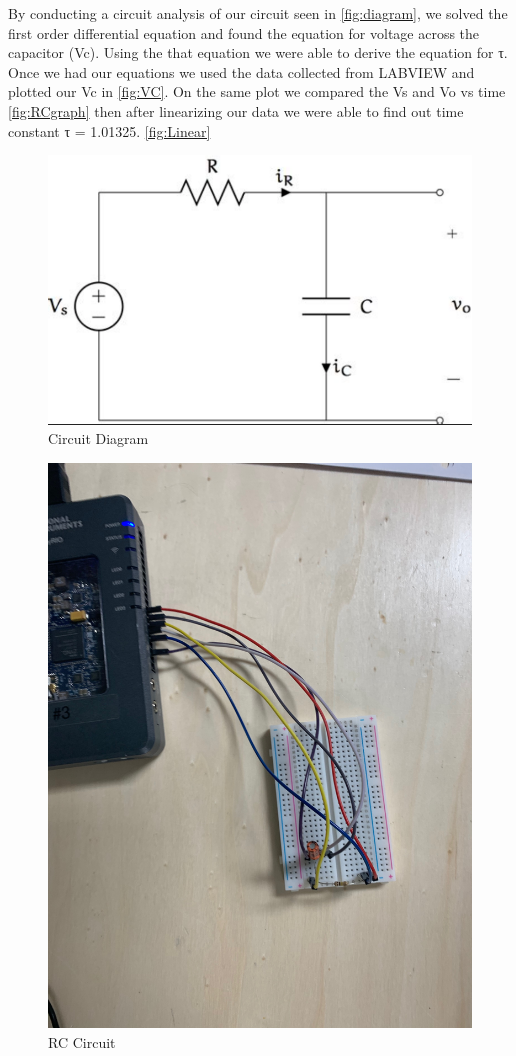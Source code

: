 \documentclass[10pt,twocolumn]{article}
\begin{document}
   
By conducting a circuit analysis of our circuit seen in \autoref{fig:diagram},
we solved the first order differential equation and found the equation for voltage across the capacitor (Vc). Using the that equation we were able to derive the equation for τ. Once we had our equations we used the data collected from LABVIEW and plotted our Vc in \autoref{fig:VC}.
On the same plot we compared the Vs and Vo vs time \autoref{fig:RCgraph} then after linearizing our data we were able to find out time constant τ = 1.01325. \autoref{fig:Linear}




 
\begin{figure}[bt]
	\centering
	\includegraphics[width=.9\linewidth]{figures/diagram.PNG}
	\caption{Circuit Diagram}
	\label{fig:diagram}
\end{figure}

\begin{figure}[bt]
	\centering
	\includegraphics[width=.9\linewidth]{figures/RC.PNG}
	\caption{RC Circuit}
	\label{fig:circuit}
\end{figure}
\end{document}
